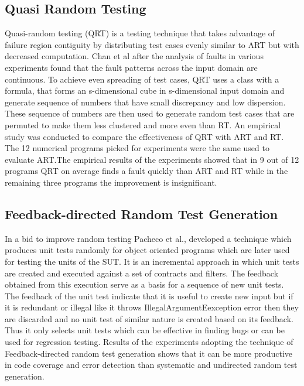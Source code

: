 \subsection{Quasi Random Testing}
Quasi-random testing (QRT) \cite{Chen2005} is a testing technique that takes advantage of failure region contiguity by distributing test cases evenly similar to ART but with decreased computation. Chan et al after the analysis of faults in various experiments found that the fault patterns across the input domain are continuous. To achieve even spreading of test cases, QRT uses a class with a formula, that forms an s-dimensional cube in s-dimensional input domain and generate sequence of numbers that have small discrepancy and low dispersion. These sequence of numbers are then used to generate random test cases that are permuted to make them less clustered and more even than RT. An empirical study was conducted to compare the effectiveness of QRT with ART and RT. The 12 numerical programs picked for experiments were the same used to evaluate ART.The empirical results of the experiments showed that in 9 out of 12 programs QRT on average finds a fault quickly than ART and RT while in the remaining three programs the improvement is insignificant.


\subsection{Feedback-directed Random Test Generation}
In a bid to improve random testing Pacheco et al., \cite{Pacheco2007} developed a technique which produces unit tests randomly for object oriented programs which are later used for testing the units of the SUT. It is an incremental approach in which unit tests are created and executed against a set of contracts and filters. The feedback obtained from this execution serve as a basis for a sequence of new unit tests. The feedback of the unit test indicate that it is useful to create new input but if it is redundant or illegal like it throws IllegalArgumentEexception error then they are discarded and no unit test of similar nature is created based on its feedback. Thus it only selects unit tests which can be effective in finding bugs or can be used for regression testing.
Results of the experiments adopting the technique of Feedback-directed random test generation shows that it can be more productive in code coverage and error detection than systematic and undirected random test generation.

